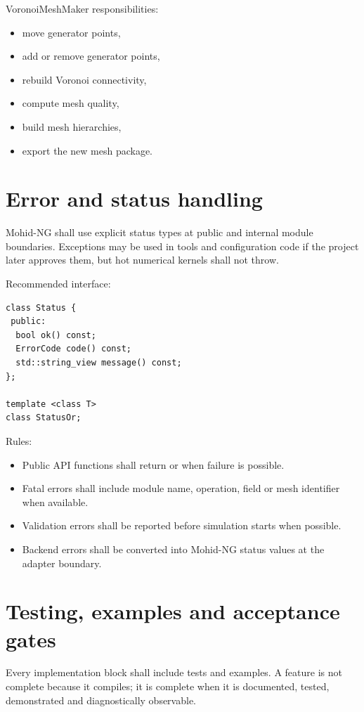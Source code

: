 \documentclass[11pt,a4paper]{article}
\newcommand{\Code}[1]{\texttt{\detokenize{#1}}}
\begin{document}
VoronoiMeshMaker responsibilities:

\begin{itemize}
  \item move generator points,
  \item add or remove generator points,
  \item rebuild Voronoi connectivity,
  \item compute mesh quality,
  \item build mesh hierarchies,
  \item export the new mesh package.
\end{itemize}

\section{Error and status handling}

Mohid-NG shall use explicit status types at public and internal module boundaries. Exceptions may be used in tools and configuration code if the project later approves them, but hot numerical kernels shall not throw.

Recommended interface:

\begin{lstlisting}
class Status {
 public:
  bool ok() const;
  ErrorCode code() const;
  std::string_view message() const;
};

template <class T>
class StatusOr;
\end{lstlisting}

Rules:

\begin{itemize}
  \item Public API functions shall return \Code{Status} or \Code{StatusOr<T>} when failure is possible.
  \item Fatal errors shall include module name, operation, field or mesh identifier when available.
  \item Validation errors shall be reported before simulation starts when possible.
  \item Backend errors shall be converted into Mohid-NG status values at the adapter boundary.
\end{itemize}

\section{Testing, examples and acceptance gates}

Every implementation block shall include tests and examples. A feature is not complete because it compiles; it is complete when it is documented, tested, demonstrated and diagnostically observable.
\end{document}

